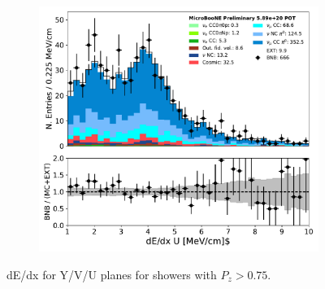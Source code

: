 \begin{figure}[H]
\begin{center}
\begin{subfigure}[b]{0.3\textwidth}
    \caption{}
    \end{subfigure}
    \begin{subfigure}[b]{0.3\textwidth}
    \centering
    \includegraphics[width=1.00\textwidth]{pi0/calorimetry/shr_tkfit_dedx_U_03112020_ALL_scaled_pz075.pdf}
    \caption{}
    \end{subfigure}
\caption{dE/dx for Y/V/U planes for showers with $P_z > 0.75$.}
\label{fig:pi0:calorimetry:dedxpz}
\end{center}
\end{figure}

